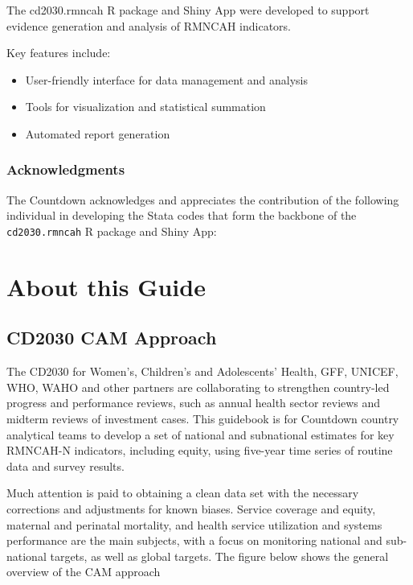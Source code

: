 \documentclass[
  english,
  letterpaper,
  DIV=11,
  numbers=noendperiod]{scrreprt}
\begin{document}

The cd2030.rmncah R package and Shiny App were developed to support
evidence generation and analysis of RMNCAH indicators.

Key features include:

\begin{itemize}
\item
  User-friendly interface for data management and analysis
\item
  Tools for visualization and statistical summation
\item
  Automated report generation
\end{itemize}

\section*{Acknowledgments}\label{acknowledgments}


The Countdown acknowledges and appreciates the contribution of the
following individual in developing the Stata codes that form the
backbone of the \texttt{cd2030.rmncah} R package and Shiny App:

\part{About this Guide}

\chapter{CD2030 CAM Approach}\label{cd2030-cam-approach}

The CD2030 for Women's, Children's and Adolescents' Health, GFF, UNICEF,
WHO, WAHO and other partners are collaborating to strengthen country-led
progress and performance reviews, such as annual health sector reviews
and midterm reviews of investment cases. This guidebook is for Countdown
country analytical teams to develop a set of national and subnational
estimates for key RMNCAH-N indicators, including equity, using five-year
time series of routine data and survey results.

Much attention is paid to obtaining a clean data set with the necessary
corrections and adjustments for known biases. Service coverage and
equity, maternal and perinatal mortality, and health service utilization
and systems performance are the main subjects, with a focus on
monitoring national and sub-national targets, as well as global targets.
The figure below shows the general overview of the CAM approach
\end{document}
